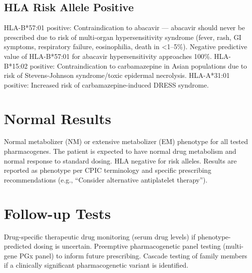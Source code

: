 \subsection*{HLA Risk Allele Positive}
HLA-B*57:01 positive: Contraindication to abacavir --- abacavir should never be prescribed due to risk of multi-organ hypersensitivity syndrome (fever, rash, GI symptoms, respiratory failure, eosinophilia, death in <1--5\%). Negative predictive value of HLA-B*57:01 for abacavir hypersensitivity approaches 100\%. HLA-B*15:02 positive: Contraindication to carbamazepine in Asian populations due to risk of Stevens-Johnson syndrome/toxic epidermal necrolysis. HLA-A*31:01 positive: Increased risk of carbamazepine-induced DRESS syndrome.

\section*{Normal Results}
Normal metabolizer (NM) or extensive metabolizer (EM) phenotype for all tested pharmacogenes. The patient is expected to have normal drug metabolism and normal response to standard dosing. HLA negative for risk alleles. Results are reported as phenotype per CPIC terminology and specific prescribing recommendations (e.g., ``Consider alternative antiplatelet therapy'').

\section*{Follow-up Tests}
Drug-specific therapeutic drug monitoring (serum drug levels) if phenotype-predicted dosing is uncertain. Preemptive pharmacogenetic panel testing (multi-gene PGx panel) to inform future prescribing. Cascade testing of family members if a clinically significant pharmacogenetic variant is identified.

